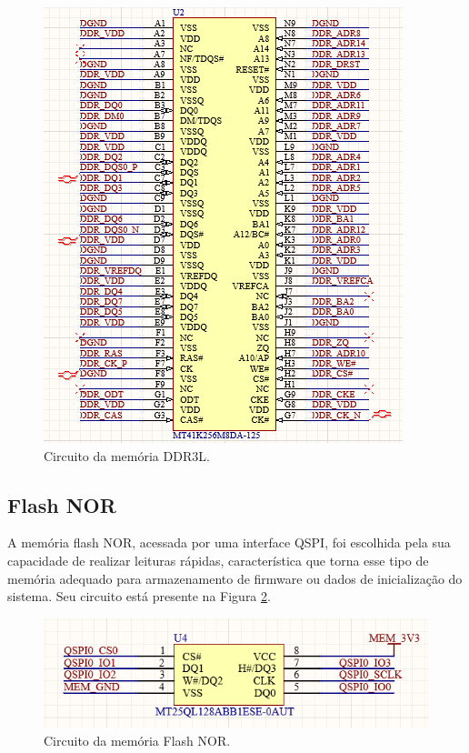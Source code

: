 \begin{figure}[H]
    \centering
    \includegraphics[scale=0.7]{images/ddr3l.png}
    \caption{Circuito da memória DDR3L.}
    \label{fig:ddr3l}
\end{figure}

\subsection{Flash NOR}

A memória flash NOR, acessada por uma interface QSPI, foi escolhida pela sua capacidade de realizar leituras rápidas, característica que torna esse tipo de memória adequado para armazenamento de firmware ou dados de inicialização do sistema. Seu circuito está presente na Figura \ref{fig:fnor}.

\begin{figure}[H]
    \centering
    \includegraphics[scale=0.7]{images/flash nor.png}
    \caption{Circuito da memória Flash NOR.}
    \label{fig:fnor}
\end{figure}

